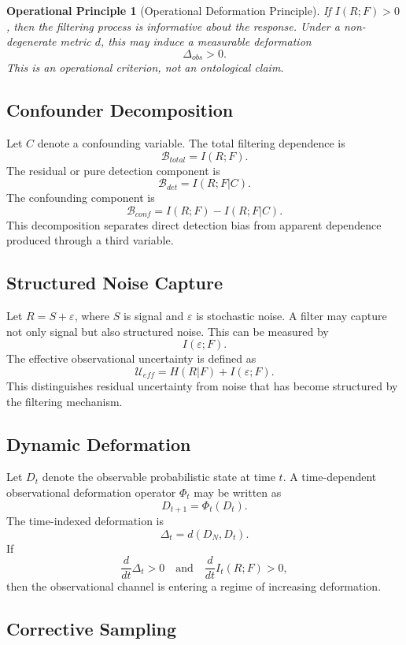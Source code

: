 \documentclass[11pt]{article}
\newtheorem{principle}{Operational Principle}
\begin{document}
\begin{principle}[Operational Deformation Principle]
If $I(R;F)>0$, then the filtering process is informative about the response. Under a non-degenerate metric $d$, this may induce a measurable deformation
\[
\Delta_{obs}>0.
\]
This is an operational criterion, not an ontological claim.
\end{principle}

\subsection{Confounder Decomposition}

Let $C$ denote a confounding variable. The total filtering dependence is
\[
\mathcal{B}_{total}=I(R;F).
\]
The residual or pure detection component is
\[
\mathcal{B}_{det}=I(R;F|C).
\]
The confounding component is
\[
\mathcal{B}_{conf}=I(R;F)-I(R;F|C).
\]
This decomposition separates direct detection bias from apparent dependence produced through a third variable.

\subsection{Structured Noise Capture}

Let $R=S+\varepsilon$, where $S$ is signal and $\varepsilon$ is stochastic noise. A filter may capture not only signal but also structured noise. This can be measured by
\[
I(\varepsilon;F).
\]
The effective observational uncertainty is defined as
\[
\mathcal{U}_{eff}=H(R|F)+I(\varepsilon;F).
\]
This distinguishes residual uncertainty from noise that has become structured by the filtering mechanism.

\subsection{Dynamic Deformation}

Let $D_t$ denote the observable probabilistic state at time $t$. A time-dependent observational deformation operator $\Phi_t$ may be written as
\[
D_{t+1}=\Phi_t(D_t).
\]
The time-indexed deformation is
\[
\Delta_t=d(D_N,D_t).
\]
If
\[
\frac{d}{dt}\Delta_t>0
\quad\text{and}\quad
\frac{d}{dt}I_t(R;F)>0,
\]
then the observational channel is entering a regime of increasing deformation.

\subsection{Corrective Sampling}
\end{document}

